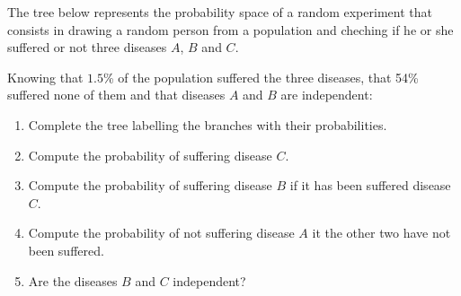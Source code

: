 {
The tree below represents the probability space of a random experiment that consists in drawing a random person from a population and cheching if he or she suffered or not three diseases $A$, $B$ and $C$.

\begin{center}
\end{center}

Knowing that $1.5$\% of the population suffered the three diseases, that 54\% suffered none of them and that diseases $A$ and $B$ are independent:

\begin{enumerate}
\item Complete the tree labelling the branches with their probabilities.
\item Compute the probability of suffering disease $C$.
\item Compute the probability of suffering disease $B$ if it has been suffered disease $C$.
\item Compute the probability of not suffering disease $A$ it the other two have not been suffered.
\item Are the diseases $B$ and $C$ independent?
\end{enumerate}
}
